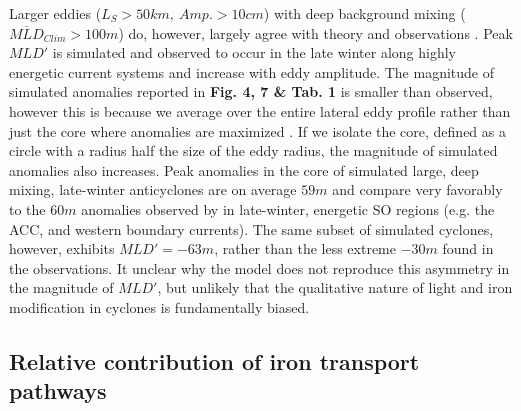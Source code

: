 Larger eddies ($L_S>50 km, \ Amp.>10 cm$) with deep background mixing ($\overline{MLD}_{Clim}>100m$) do, however, largely agree with theory \parencite{McGillicuddyMechanismsPhysicalBiologicalBiogeochemicalInteraction2016} and observations \parencite{HausmannObservedmesoscaleeddy2017}. Peak $MLD'$ is simulated and observed \parencite{HausmannObservedmesoscaleeddy2017} to occur in the late winter along highly energetic current systems and increase with eddy amplitude. The magnitude of simulated anomalies reported in \textbf{Fig. 4, 7 \& Tab. 1} is smaller than observed, however this is because we average over the entire lateral eddy profile rather than just the core where anomalies are maximized \parencite{HausmannObservedmesoscaleeddy2017}. If we isolate the core, defined as a circle with a radius half the size of the eddy radius, the magnitude of simulated anomalies also increases. Peak anomalies in the core of simulated large, deep mixing, late-winter anticyclones are on average $59m$ and compare very favorably to the $60m$ anomalies observed by \textcite{HausmannObservedmesoscaleeddy2017} in late-winter, energetic SO regions (e.g. the ACC, and western boundary currents). The same subset of simulated cyclones, however, exhibits $MLD' =-63m$, rather than the less extreme $-30m$ found in the observations.  It unclear why the model does not reproduce this asymmetry in the magnitude of $MLD'$, but unlikely that the qualitative nature of light and iron modification in cyclones is fundamentally biased.  
    
   
    
\subsection{Relative contribution of iron transport pathways}
    
